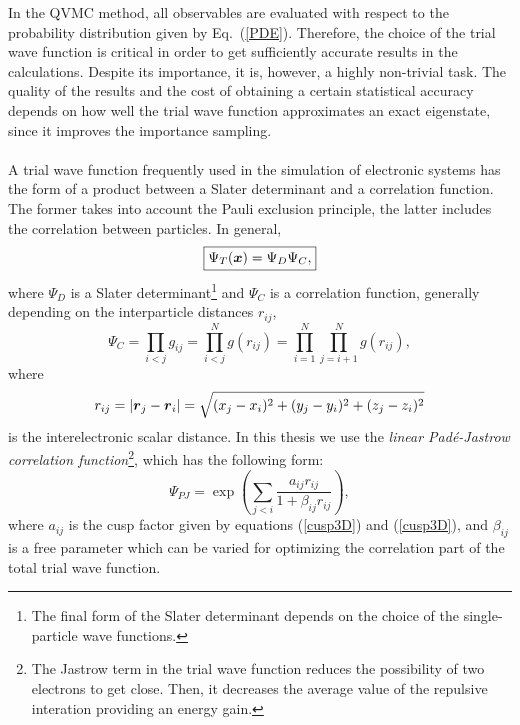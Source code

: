 In the QVMC method, all observables are evaluated with respect to the probability distribution given by Eq.~(\ref{PDE}). Therefore, the choice of the trial wave function is critical in order to get sufficiently accurate results in the calculations. Despite its importance, it is, however, a highly non-trivial task. The quality of the results and the cost of  obtaining a certain statistical accuracy depends on how well the trial wave function approximates an exact eigenstate, since it improves the importance sampling.\\
\\
\noindent
A trial wave function frequently used in the simulation of electronic systems has the form of a product between a Slater determinant and a correlation function. The former takes into account the Pauli exclusion principle, the latter includes the correlation between particles. In general, 
\begin{equation}\label{slaterJastrowTWF}
\boxed{\Psi_T(\boldsymbol{x}) = \Psi_D \Psi_C,}
\end{equation}
where $\Psi_D$ is a Slater determinant\footnote{The final form of the Slater determinant depends on the choice of the single-particle wave functions.} and $\Psi_C$ is a correlation function, generally depending on the interparticle distances $r_{ij}$, 
\begin{equation}\label{psiC}
 \Psi_C = \prod_{i<j} g_{ij} = \prod_{i<j}^{N} g(r_{ij}) = \prod_{i=1}^{N} \prod_{j=i+1}^{N} g(r_{ij}),
\end{equation}
where 
\begin{equation}\label{scalarDistance}
r_{ij} = |\boldsymbol{r}_j - \boldsymbol{r}_i| = \sqrt{(x_j-x_i)^2+(y_j-y_i)^2+(z_j-z_i)^2} 
\end{equation}
is the interelectronic scalar distance. In this thesis we use the \emph{linear Pad\'e-Jastrow correlation function}\footnote{The Jastrow term in the trial wave function reduces the possibility of two electrons to get close. Then, it decreases the average value of the repulsive interation providing an energy gain.}, which has the following form:
\begin{equation}\label{linealPJ}
\boxed{\Psi_{PJ} = \exp\left(\sum\limits_{j<i}\frac{a_{ij}r_{ij}}{1 + \beta_{ij}r_{ij}}\right),}
\end{equation}
where $a_{ij}$ is the cusp factor given by equations (\ref{cusp3D}) and (\ref{cusp3D}), and $\beta_{ij}$ is a free parameter which can be varied for optimizing the correlation part of the total trial wave function.


